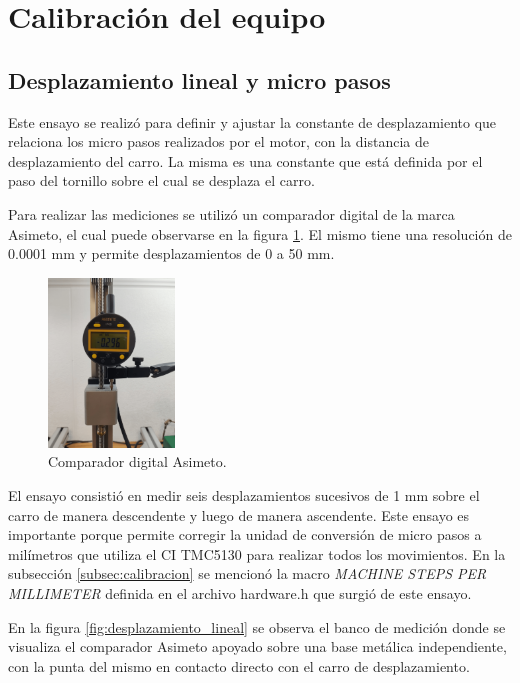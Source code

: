   
\section{Calibración del equipo}
\label{sec:calibración}
\subsection{Desplazamiento lineal y micro pasos}

Este ensayo se realizó para definir y ajustar la constante de desplazamiento que relaciona los micro pasos realizados por el motor, con la distancia de desplazamiento del carro. La misma es una constante que está definida por el paso del tornillo sobre el cual se desplaza el carro.

Para realizar las mediciones se utilizó un comparador digital de la marca Asimeto\citep{web_asimeto}, el cual puede observarse en la figura \ref{fig:micrometro}. El mismo tiene una resolución de 0.0001 mm y permite desplazamientos de 0 a 50 mm.


\begin{figure}[h]
\centering 
\includegraphics[width=0.3\textwidth]{./Figures/micrometro.png}
\caption{Comparador digital Asimeto.}
\label{fig:micrometro}
\end{figure}

El ensayo consistió en medir seis desplazamientos sucesivos de 1 mm sobre el carro de manera descendente y luego de manera ascendente. Este ensayo es importante porque permite corregir la unidad de conversión de micro pasos a milímetros que utiliza el CI TMC5130 para realizar todos los movimientos. 
En la subsección \ref{subsec:calibracion} se mencionó la macro \textit{MACHINE STEPS PER MILLIMETER} definida en el archivo hardware.h que surgió de este ensayo. 

En la figura \ref{fig:desplazamiento_lineal} se observa el banco de medición donde se visualiza el comparador Asimeto apoyado sobre una base metálica independiente, con la punta del mismo en contacto directo con el carro de desplazamiento.


